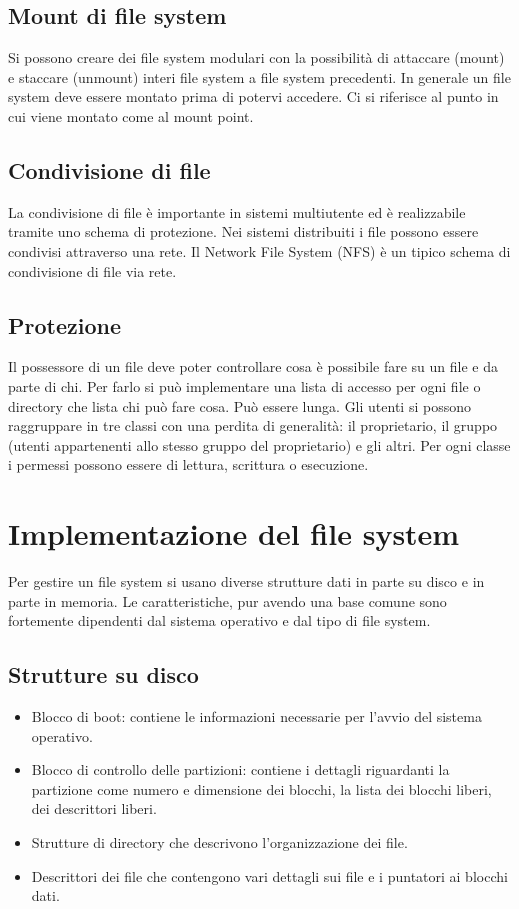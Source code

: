 \subsection{Mount di file system}
Si possono creare dei file system modulari con la possibilit\`a di attaccare (mount) e staccare (unmount) interi file system a file system precedenti. In generale un file system deve
essere montato prima di potervi accedere. Ci si riferisce al punto in cui viene montato come al mount point. 
\subsection{Condivisione di file}
La condivisione di file \`e importante in sistemi multiutente ed \`e realizzabile tramite uno schema di protezione. Nei sistemi distribuiti i file possono essere condivisi attraverso
una rete. Il Network File System (NFS) \`e un tipico schema di condivisione di file via rete. 
\subsection{Protezione}
Il possessore di un file deve poter controllare cosa \`e possibile fare su un file e da parte di chi. Per farlo si pu\`o implementare una lista di accesso per ogni file o directory
che lista chi pu\`o fare cosa. Pu\`o essere lunga. Gli utenti si possono raggruppare in tre classi con una perdita di generalit\`a: il proprietario, il gruppo (utenti appartenenti allo
stesso gruppo del proprietario) e gli altri. Per ogni classe i permessi possono essere di lettura, scrittura o esecuzione. 
\section{Implementazione del file system}
Per gestire un file system si usano diverse strutture dati in parte su disco e in parte in memoria. Le caratteristiche, pur avendo una base comune sono fortemente dipendenti dal 
sistema operativo e dal tipo di file system. 
\subsection{Strutture su disco}
\begin{itemize}
	\item Blocco di boot: contiene le informazioni necessarie per l'avvio del sistema operativo.
	\item Blocco di controllo delle partizioni: contiene i dettagli riguardanti la partizione come numero e dimensione dei blocchi, la lista dei blocchi liberi, dei descrittori 
		liberi.
	\item Strutture di directory che descrivono l'organizzazione dei file.
	\item Descrittori dei file che contengono vari dettagli sui file e i puntatori ai blocchi dati. 
\end{itemize}
